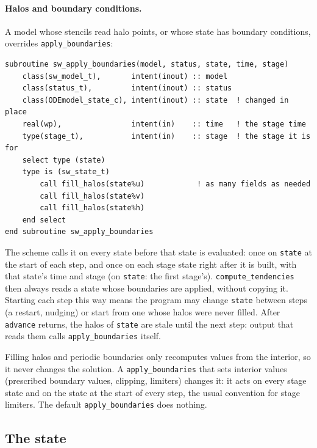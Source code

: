 \documentclass[11pt,a4paper]{article}
\newcommand{\code}[1]{\texttt{#1}}
\begin{document}
\paragraph{Halos and boundary conditions.} A model whose stencils read halo
points, or whose state has boundary conditions, overrides \code{apply\_boundaries}:
\begin{lstlisting}
subroutine sw_apply_boundaries(model, status, state, time, stage)
    class(sw_model_t),       intent(inout) :: model
    class(status_t),         intent(inout) :: status
    class(ODEmodel_state_c), intent(inout) :: state  ! changed in place
    real(wp),                intent(in)    :: time   ! the stage time
    type(stage_t),           intent(in)    :: stage  ! the stage it is for
    select type (state)
    type is (sw_state_t)
        call fill_halos(state%u)            ! as many fields as needed
        call fill_halos(state%v)
        call fill_halos(state%h)
    end select
end subroutine sw_apply_boundaries
\end{lstlisting}
The scheme calls it on every state before that state is evaluated: once on
\code{state} at the start of each step, and once on each stage state right
after it is built, with that state's time and stage (on \code{state}: the
first stage's). \code{compute\_tendencies} then
always reads a state whose boundaries are applied, without copying it. Starting each step this
way means the program may change \code{state} between steps (a restart,
nudging) or start from one whose halos were never filled. After
\code{advance} returns, the halos of \code{state} are stale until the next
step: output that reads them calls \code{apply\_boundaries} itself.

Filling halos and periodic boundaries only recomputes values from the
interior, so it never changes the solution. A \code{apply\_boundaries} that sets
interior values (prescribed boundary values, clipping, limiters) changes it:
it acts on every stage state and on the state at the start of every step,
the usual convention for stage limiters. The default \code{apply\_boundaries} does
nothing.

\subsection{The state}
\end{document}
